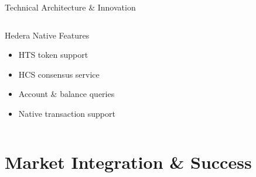 \documentclass[aspectratio=169]{beamer}
\providecommand{\faSearchDollar}{\faDollarSign}
\begin{document}
\begin{frame}{Technical Architecture \& Innovation}
\begin{columns}
\begin{block}{Hedera Native Features \hfill
{}}
\begin{itemize}
\item[\color{primary}\faCoins] HTS token support
\item[\color{primary}\faComments] HCS consensus service
\item[\color{primary}\faSearchDollar] Account \& balance queries
\item[\color{primary}\faSync] Native transaction support
\end{itemize}
\end{block}
\end{columns}
\end{frame}

\section{Market Integration \& Success}
\end{document}
